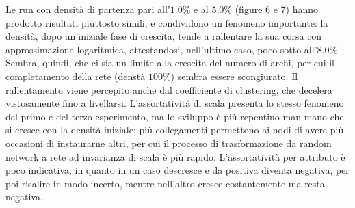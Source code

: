 \documentclass[a4paper,12pt]{article}
\begin{document}
Le run con densità di partenza pari all'$1.0\%$ e al $5.0\%$ (figure 6 e 7) hanno prodotto risultati piuttosto simili, e condividono un fenomeno importante: la densità, dopo un'iniziale fase di crescita, tende a rallentare la sua corsa con approssimazione logaritmica, attestandosi, nell'ultimo caso, poco sotto all'$8.0\%$. Sembra, quindi, che ci sia un limite alla crescita del numero di archi, per cui il completamento della rete (denstà $100\%$) sembra essere scongiurato. Il rallentamento viene percepito anche dal coefficiente di clustering, che decelera vistosamente fino a livellarsi. L'assortatività di scala presenta lo stesso fenomeno del primo e del terzo esperimento, ma lo sviluppo è più repentino man mano che si cresce con la densità iniziale: più collegamenti permettono ai nodi di avere più occasioni di instaurarne altri, per cui il processo di trasformazione da random network a rete ad invarianza di scala è più rapido. L'assortatività per attributo è poco indicativa, in quanto in un caso descresce e da positiva diventa negativa, per poi risalire in modo incerto, mentre nell'altro cresce costantemente ma resta negativa.
\end{document}
